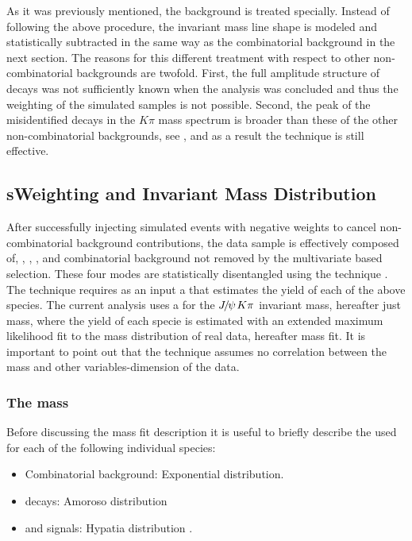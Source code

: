 As it was previously mentioned, the \LbJpsippi background is treated specially. Instead of following the above
procedure, the \LbJpsippi invariant mass line shape is modeled and statistically subtracted in the same way as the
combinatorial background in the next section. The reasons for this different treatment with respect to other
non-combinatorial backgrounds are twofold. First, the full amplitude structure of \LbJpsippi decays was not
sufficiently known \cite{Aaij:2014zoa} when the analysis was concluded and thus the weighting of the simulated samples is not possible.
Second, the peak of the misidentified \LbJpsippi decays in the \jpsi$K\pi$ mass spectrum is broader than these
of the other non-combinatorial backgrounds, see , and as a result the \sPlot technique is still
effective.


\subsection{sWeighting and Invariant Mass Distribution}
\label{sWeighting_and_mass}

After successfully injecting simulated events with negative weights to cancel non-combinatorial background contributions,
the data sample is effectively composed of, \BdJpsiKpi, \BsJpsiKpi, \LbJpsippi, and combinatorial background not removed by the
multivariate based selection. These four modes are statistically disentangled using the \sPlot technique \cite{splot}.
The technique requires as an input a \pdf that estimates the yield of each of the above species. The current analysis uses
a \pdf for the ${J\mskip -3mu/\mskip -2mu\psi\mskip 2mu} K\pi$ invariant mass, hereafter just mass, where the yield of each specie is estimated with an extended
maximum likelihood fit to the mass distribution of real data, hereafter mass fit. It is important to point out that the \sPlot
technique assumes no correlation between the mass and other variables-dimension of the data.

\subsubsection{The mass \pdf}
Before discussing the mass fit description it is useful to briefly describe the \pdfs used for each of the following individual species:

\begin{itemize}
\item Combinatorial background: Exponential distribution.
\item \LbJpsippi decays: Amoroso distribution \cite{Amoroso}
\item \Bd and \Bs signals: Hypatia distribution \cite{Santos:2013gra}.
\end{itemize}

